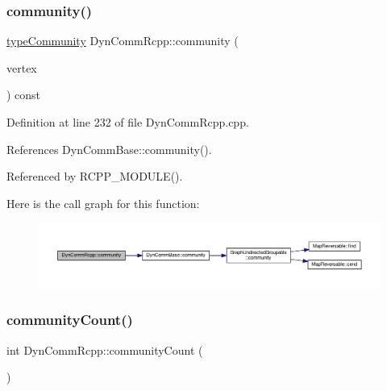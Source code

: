 \subsubsection{\texorpdfstring{community()}{community()}}
{\footnotesize\ttfamily \hyperlink{graphUndirectedGroupable_8h_a914da95c9ea7f14f4b7f875c36818556}{type\+Community} Dyn\+Comm\+Rcpp\+::community (\begin{DoxyParamCaption}\item[{\hyperlink{edge_8h_a5fbd20c46956d479cb10afc9855223f6}{type\+Vertex}}]{vertex }\end{DoxyParamCaption}) const\hspace{0.3cm}{\ttfamily [inline]}}



Definition at line 232 of file Dyn\+Comm\+Rcpp.\+cpp.



References Dyn\+Comm\+Base\+::community().



Referenced by R\+C\+P\+P\+\_\+\+M\+O\+D\+U\+L\+E().

Here is the call graph for this function\+:
\nopagebreak
\begin{figure}[H]
\begin{center}
\leavevmode
\includegraphics[width=350pt]{classDynCommRcpp_ac3c8c1759d2ab106b757557e09834ec5_cgraph}
\end{center}
\end{figure}
\mbox{\label{classDynCommRcpp_a67948d5821c2ccffc4dbf47bac6fba70}} 
\subsubsection{\texorpdfstring{community\+Count()}{communityCount()}}
{\footnotesize\ttfamily int Dyn\+Comm\+Rcpp\+::community\+Count (\begin{DoxyParamCaption}{ }\end{DoxyParamCaption})\hspace{0.3cm}{\ttfamily [inline]}}

